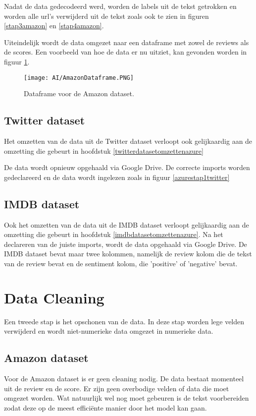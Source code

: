 Nadat de data gedecodeerd werd, worden de labels uit de tekst getrokken en worden alle url's verwijderd uit de tekst zoals ook te zien in figuren \ref{stap3amazon} en \ref{stap4amazon}. 

Uiteindelijk wordt de data omgezet naar een \gls{dataframe} met zowel de reviews als de scores. Een voorbeeld van hoe de data er nu uitziet, kan gevonden worden in figuur \ref{amazondataframe}.

\begin{figure}[!htbp]
    \texttt{[image: AI/AmazonDataframe.PNG]}
    \caption{\label{amazondataframe}Dataframe voor de Amazon dataset.}
\end{figure}
\FloatBarrier 

\subsection{Twitter dataset}
Het omzetten van de data uit de Twitter dataset verloopt ook gelijkaardig aan de omzetting die gebeurt in hoofdstuk \ref{twitterdatasetomzettenazure}

De data wordt opnieuw opgehaald via Google Drive. De correcte imports worden gedeclareerd en de data wordt ingelezen zoals in figuur \ref{azurestap1twitter}

\subsection{IMDB dataset}
Ook het omzetten van de data uit de IMDB dataset verloopt gelijkaardig aan de omzetting die gebeurt in hoofdstuk \ref{imdbdatasetomzettenazure}.
Na het declareren van de juiste imports, wordt de data opgehaald via Google Drive. De IMDB dataset bevat maar twee kolommen, namelijk de review kolom die de tekst van de review bevat en de sentiment kolom, die 'positive' of 'negative' bevat. 

\section{Data Cleaning}
\label{proofofconceptdatacleaning}
Een tweede stap is het opschonen van de data. In deze stap worden lege velden verwijderd en wordt niet-numerieke data omgezet in numerieke data.

\subsection{Amazon dataset}
Voor de Amazon dataset is er geen cleaning nodig. De data bestaat momenteel uit de review en de score. Er zijn geen overbodige velden of data die moet omgezet worden. Wat natuurlijk wel nog moet gebeuren is de tekst voorbereiden zodat deze op de meest efficiënte manier door het model kan gaan.

